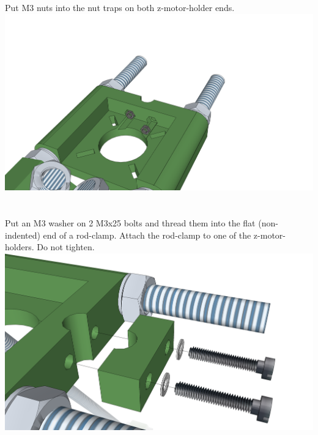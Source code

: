 \documentclass[twoside,openany,a4paper,titlepage]{memoir}
\begin{document}
	\section{}
	Put M3 nuts into the nut traps on both z-motor-holder ends.\\
	\includegraphics[width=1\linewidth]{graphics/ch8_3.png}
	
	\section{}
	Put an M3 washer on 2 M3x25 bolts and thread them into the flat (non-indented) end of a rod-clamp.
	Attach the rod-clamp to one of the z-motor-holders. Do not tighten.\\
	\includegraphics[width=1\linewidth]{graphics/ch8_4.png}
	
\end{document}
